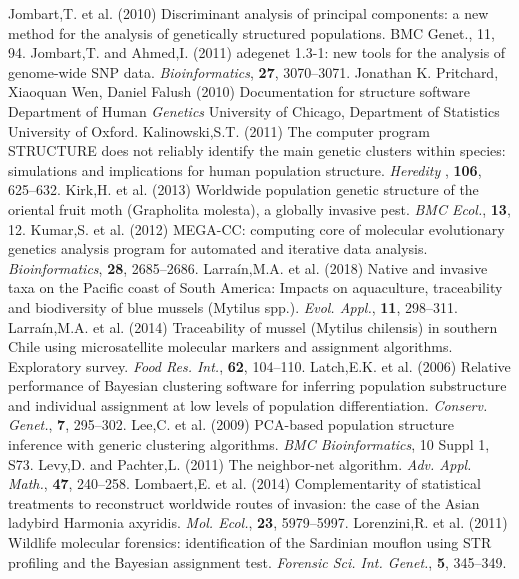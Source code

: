\documentclass{bioinfo}
\begin{document}
\begin{thebibliography}{}
\bibitem[a ()]{}Jombart,T. et al. (2010) Discriminant analysis of principal components: a new method for the analysis of genetically structured populations. BMC Genet., 11, 94.
\bibitem[a ()]{}Jombart,T. and Ahmed,I. (2011) adegenet 1.3-1: new tools for the analysis of genome-wide SNP data. \textit{Bioinformatics}, \textbf{27}, 3070–3071.
\bibitem[a ()]{}Jonathan K. Pritchard, Xiaoquan Wen, Daniel Falush (2010) Documentation for structure software Department of Human \textit{Genetics} University of Chicago, Department of Statistics University of Oxford.
\bibitem[a ()]{}Kalinowski,S.T. (2011) The computer program STRUCTURE does not reliably identify the main genetic clusters within species: simulations and implications for human population structure. \textit{Heredity }, \textbf{106}, 625–632.
\bibitem[a ()]{}Kirk,H. et al. (2013) Worldwide population genetic structure of the oriental fruit moth (Grapholita molesta), a globally invasive pest. \textit{BMC Ecol.}, \textbf{13}, 12.
\bibitem[a ()]{}Kumar,S. et al. (2012) MEGA-CC: computing core of molecular evolutionary genetics analysis program for automated and iterative data analysis. \textit{Bioinformatics}, \textbf{28}, 2685–2686.
\bibitem[a ()]{}Larraín,M.A. et al. (2018) Native and invasive taxa on the Pacific coast of South America: Impacts on aquaculture, traceability and biodiversity of blue mussels (Mytilus spp.). \textit{Evol. Appl.}, \textbf{11}, 298–311.
\bibitem[a ()]{}Larraín,M.A. et al. (2014) Traceability of mussel (Mytilus chilensis) in southern Chile using microsatellite molecular markers and assignment algorithms. Exploratory survey. \textit{Food Res. Int.}, \textbf{62}, 104–110.
\bibitem[a ()]{}Latch,E.K. et al. (2006) Relative performance of Bayesian clustering software for inferring population substructure and individual assignment at low levels of population differentiation. \textit{Conserv. Genet.}, \textbf{7}, 295–302.
\bibitem[a ()]{}Lee,C. et al. (2009) PCA-based population structure inference with generic clustering algorithms. \textit{BMC Bioinformatics}, 10 Suppl 1, S73.
\bibitem[a ()]{}Levy,D. and Pachter,L. (2011) The neighbor-net algorithm. \textit{Adv. Appl. Math.}, \textbf{47}, 240–258.
\bibitem[a ()]{}Lombaert,E. et al. (2014) Complementarity of statistical treatments to reconstruct worldwide routes of invasion: the case of the Asian ladybird Harmonia axyridis. \textit{Mol. Ecol.}, \textbf{23}, 5979–5997.
\bibitem[a ()]{}Lorenzini,R. et al. (2011) Wildlife molecular forensics: identification of the Sardinian mouflon using STR profiling and the Bayesian assignment test. \textit{Forensic Sci. Int. Genet.}, \textbf{5}, 345–349.

\end{thebibliography}
\end{document}
